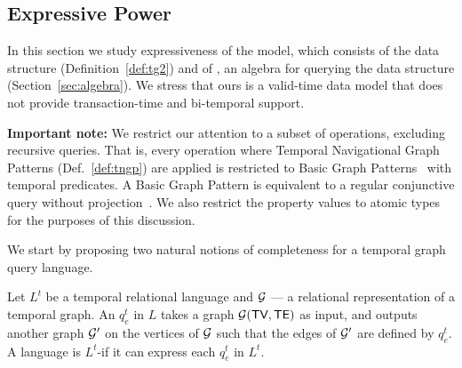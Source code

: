 


\subsection{Expressive Power}
\label{sec:epower}

In this section we study expressiveness of the \tg model, which
consists of the \tg data structure (Definition~\ref{def:tg2}) and of
\tga, an algebra for querying the data structure
(Section~\ref{sec:algebra}). We stress that ours is a valid-time data
model that does not provide transaction-time and bi-temporal support.

{\bf Important note:} We restrict our attention to a subset of \tga
operations, excluding recursive queries.  That is, every operation
where Temporal Navigational Graph Patterns (Def.~\ref{def:tngp}) are
applied is restricted to Basic Graph
Patterns~\cite{DBLP:journals/corr/AnglesABHRV16} with temporal
predicates.  A Basic Graph Pattern is equivalent to a regular
conjunctive query without projection~\cite{Abiteboul1995}.  We also
restrict the property values to atomic types for the purposes of this
discussion.

We start by proposing two natural notions of completeness for a
temporal graph query language.

\begin{definition}
  Let $L^t$ be a temporal relational language and $\mathcal{G}$ --- a
  relational representation of a temporal graph.  An \edgeq $q^t_e$ in
  $L$ takes a graph $\mathcal{G} (\textsf{TV}, \textsf{TE})$ as input, and
  outputs another graph $\mathcal{G}'$ on the vertices of $\mathcal{G}$ such that
  the edges of $\mathcal{G}'$ are defined by $q^t_e$.  A language is
  $L^t$-\edgec if it can express each $q^t_e$ in $L^t$.
  \label{def:edgecomplete}
\end{definition}

